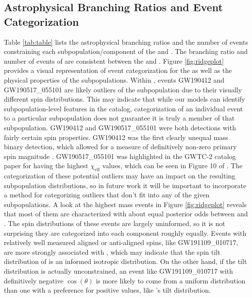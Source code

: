 \subsection{Astrophysical Branching Ratios and Event Categorization}

Table \ref{tab:table} lists the astrophysical branching ratios and the number of events constraining each subpopulation/component of the \base{} and \comp{}. The branching ratio and number of events of \first{} are consistent between the \base{} and \comp{}. Figure \ref{fig:ridgeplot} provides a visual representation of event categorization for the \comp{} as well as the physical properties of the subpopulations. Within \contA{}, events GW190412 and GW190517\_055101 are likely outliers of the subpopulation due to their visually different spin distributions. This may indicate that while our models can identify subpopulation-level features in the catalog, categorization of an individual event to a particular subpopulation does not guarantee it is truly a member of that subpopulation. GW190412 and GW190517\_055101 were both detections with fairly certain spin properties. GW190412 was the first clearly unequal mass binary detection, which allowed for a measure of definitively non-zero primary spin magnitude \citep{10.3847/2041-8213/aba8ef, 2010.14527}. GW190517\_055101 was highlighted in the GWTC-2 catalog paper \citet{2010.14527} for having the highest $\chi_\text{eff}$ values, which can be seen in Figure 10 of \citet{2010.14527}. The categorization of these potential outliers may have an impact on the resulting subpopulation distributions, so in future work it will be important to incorporate a method for categorizing outliers that don't fit into any of the given subpopulations.
A look at the highest mass events in Figure \ref{fig:ridgeplot} reveals that most of them are characterized with about equal posterior odds between \contA{} and \contB{}. The spin distributions of these events are largely uninformed, so it is not surprising they are categorized into each component roughly equally. Events with relatively well measured aligned or anti-aligned spins, like GW191109\_010717, are more strongly associated with \contB{}, which may indicate that the spin tilt distribution of \contB{} is an informed isotropic distribution. On the other hand, if the tilt distribution is actually unconstrained, an event like GW191109\_010717 with definitively negative $\cos(\theta)$ is more likely to come from a uniform distribution than one with a preference for positive values, like \contA{}'s tilt distribution.

